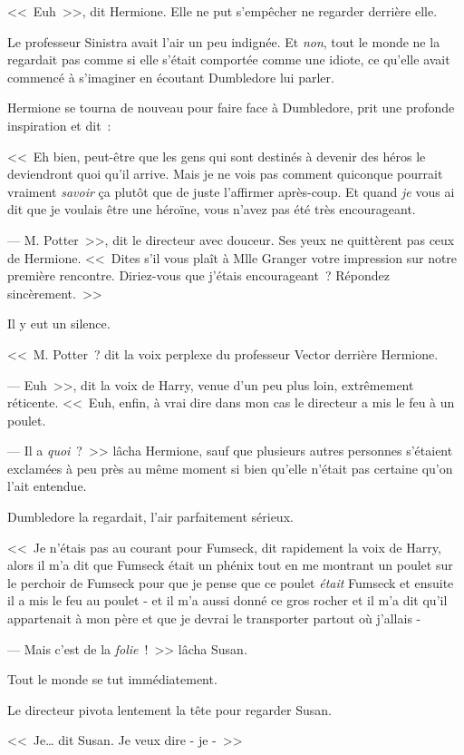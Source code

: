 <<~Euh~>>, dit Hermione. Elle ne put s'empêcher ne regarder derrière elle.

Le professeur Sinistra avait l'air un peu indignée. Et \emph{non}, tout le monde ne la regardait pas comme si elle s'était comportée comme une idiote, ce qu'elle avait commencé à s'imaginer en écoutant Dumbledore lui parler.

Hermione se tourna de nouveau pour faire face à Dumbledore, prit une profonde inspiration et dit~:

<<~Eh bien, peut-être que les gens qui sont destinés à devenir des héros le deviendront quoi qu'il arrive. Mais je ne vois pas comment quiconque pourrait vraiment \emph{savoir} ça plutôt que de juste l'affirmer après-coup. Et quand \emph{je} vous ai dit que je voulais être une héroïne, vous n'avez pas été très encourageant.

--- M. Potter~>>, dit le directeur avec douceur. Ses yeux ne quittèrent pas ceux de Hermione. <<~Dites s'il vous plaît à Mlle Granger votre impression sur notre première rencontre. Diriez-vous que j'étais encourageant~? Répondez sincèrement.~>>

Il y eut un silence.

<<~M. Potter~? dit la voix perplexe du professeur Vector derrière Hermione.

--- Euh~>>, dit la voix de Harry, venue d'un peu plus loin, extrêmement réticente. <<~Euh, enfin, à vrai dire dans mon cas le directeur a mis le feu à un poulet.

--- Il a \emph{quoi}~?~>> lâcha Hermione, sauf que plusieurs autres personnes s'étaient exclamées à peu près au même moment si bien qu'elle n'était pas certaine qu'on l'ait entendue.

Dumbledore la regardait, l'air parfaitement sérieux.

<<~Je n'étais pas au courant pour Fumseck, dit rapidement la voix de Harry, alors il m'a dit que Fumseck était un phénix tout en me montrant un poulet sur le perchoir de Fumseck pour que je pense que ce poulet \emph{était} Fumseck et ensuite il a mis le feu au poulet - et il m'a aussi donné ce gros rocher et il m'a dit qu'il appartenait à mon père et que je devrai le transporter partout où j'allais -

--- Mais c'est de la \emph{folie}~!~>> lâcha Susan.

Tout le monde se tut immédiatement.

Le directeur pivota lentement la tête pour regarder Susan.

<<~Je… dit Susan. Je veux dire - je -~>>

